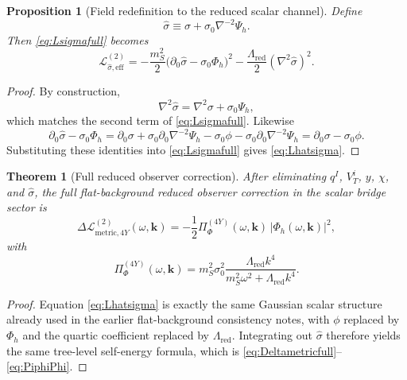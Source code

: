 \documentclass[11pt]{article}
\newtheorem{proposition}{Proposition}
\newtheorem{theorem}{Theorem}
\begin{document}
\begin{proposition}[Field redefinition to the reduced scalar channel]
\label{prop:hatsigma}
Define
\begin{equation}
\hat\sigma
\equiv
\sigma+\sigma_0\nabla^{-2}\Psi_h.
\label{eq:hatsigma}
\end{equation}
Then \eqref{eq:Lsigmafull} becomes
\begin{equation}
\mathcal L_{\hat\sigma,\mathrm{eff}}^{(2)}
=
-\frac{m_S^2}{2}\bigl(\partial_0\hat\sigma-\sigma_0\Phi_h\bigr)^2
-\frac{\Lambda_{\mathrm{red}}}{2}(\nabla^2\hat\sigma)^2.
\label{eq:Lhatsigma}
\end{equation}
\end{proposition}

\begin{proof}
By construction,
\[
\nabla^2\hat\sigma
=
\nabla^2\sigma+\sigma_0\Psi_h,
\]
which matches the second term of \eqref{eq:Lsigmafull}. Likewise
\[
\partial_0\hat\sigma-\sigma_0\Phi_h
=
\partial_0\sigma
+\sigma_0\partial_0\nabla^{-2}\Psi_h
-\sigma_0\phi
-\sigma_0\partial_0\nabla^{-2}\Psi_h
=
\partial_0\sigma-\sigma_0\phi.
\]
Substituting these identities into \eqref{eq:Lsigmafull} gives \eqref{eq:Lhatsigma}.
\end{proof}

\begin{theorem}[Full reduced observer correction]
\label{thm:fullcorr}
After eliminating \(q^I\), \(V_T^i\), \(y\), \(\chi\), and \(\hat\sigma\), the full flat-background reduced observer correction in the scalar bridge sector is
\begin{equation}
\Delta\mathcal L_{\mathrm{metric},4Y}^{(2)}(\omega,\mathbf{k})
=
-\frac{1}{2}\Pi_{\Phi}^{(4Y)}(\omega,\mathbf{k})\,|\Phi_h(\omega,\mathbf{k})|^2,
\label{eq:Deltametricfull}
\end{equation}
with
\begin{equation}
\Pi_{\Phi}^{(4Y)}(\omega,\mathbf{k})
=
m_S^2\sigma_0^2
\frac{\Lambda_{\mathrm{red}}k^4}
{m_S^2\omega^2+\Lambda_{\mathrm{red}}k^4}.
\label{eq:PiphiPhi}
\end{equation}
\end{theorem}

\begin{proof}
Equation \eqref{eq:Lhatsigma} is exactly the same Gaussian scalar structure already used in the earlier flat-background consistency notes, with \(\phi\) replaced by \(\Phi_h\) and the quartic coefficient replaced by \(\Lambda_{\mathrm{red}}\). Integrating out \(\hat\sigma\) therefore yields the same tree-level self-energy formula, which is \eqref{eq:Deltametricfull}--\eqref{eq:PiphiPhi}.
\end{proof}
\end{document}
